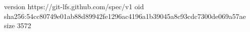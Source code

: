 version https://git-lfs.github.com/spec/v1
oid sha256:54cc80749e01ab88d89942fe1296ac4196a1b39045a8c93cdc7300de069a57ae
size 3572
